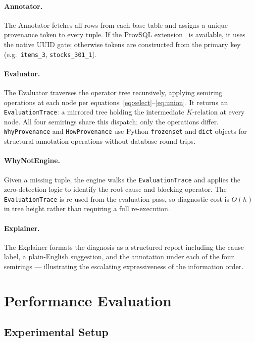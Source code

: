 \documentclass{llncs}
\begin{document}
\paragraph{Annotator.}
The Annotator fetches all rows from each base table and assigns a
unique provenance token to every tuple. If the ProvSQL
extension~\cite{Senellart2018} is available, it uses the native UUID
gate; otherwise tokens are constructed from the primary key
(e.g.\ \texttt{items\_3}, \texttt{stocks\_301\_1}).

\paragraph{Evaluator.}
The Evaluator traverses the operator tree recursively, applying semiring
operations at each node per equations~\eqref{eq:select}--\eqref{eq:union}.
It returns an \texttt{EvaluationTrace}: a mirrored tree holding the
intermediate $K$-relation at every node.
All four semirings share this dispatch; only the operations differ.
\texttt{WhyProvenance} and \texttt{HowProvenance} use Python
\texttt{frozenset} and \texttt{dict} objects for structural annotation
operations without database round-trips.

\paragraph{WhyNotEngine.}
Given a missing tuple, the engine walks the \texttt{EvaluationTrace}
and applies the zero-detection logic to identify the root cause and
blocking operator. The \texttt{EvaluationTrace} is re-used from the
evaluation pass, so diagnostic cost is $O(h)$ in tree height rather
than requiring a full re-execution.

\paragraph{Explainer.}
The Explainer formats the diagnosis as a structured report including
the cause label, a plain-English suggestion, and the annotation under
each of the four semirings — illustrating the escalating
expressiveness of the information order.

\section{Performance Evaluation}
\label{sec:evaluation}

\subsection{Experimental Setup}
\label{sec:eval-setup}
\end{document}
